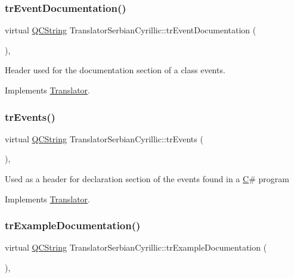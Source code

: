 \subsubsection{\texorpdfstring{trEventDocumentation()}{trEventDocumentation()}}
{\footnotesize\ttfamily virtual \mbox{\hyperlink{class_q_c_string}{Q\+C\+String}} Translator\+Serbian\+Cyrillic\+::tr\+Event\+Documentation (\begin{DoxyParamCaption}{ }\end{DoxyParamCaption})\hspace{0.3cm}{\ttfamily [inline]}, {\ttfamily [virtual]}}

Header used for the documentation section of a class\textquotesingle{} events. 

Implements \mbox{\hyperlink{class_translator}{Translator}}.

\mbox{\label{class_translator_serbian_cyrillic_a44fe734c8aebeab6c68c5bdd36e379c0}} 
\subsubsection{\texorpdfstring{trEvents()}{trEvents()}}
{\footnotesize\ttfamily virtual \mbox{\hyperlink{class_q_c_string}{Q\+C\+String}} Translator\+Serbian\+Cyrillic\+::tr\+Events (\begin{DoxyParamCaption}{ }\end{DoxyParamCaption})\hspace{0.3cm}{\ttfamily [inline]}, {\ttfamily [virtual]}}

Used as a header for declaration section of the events found in a \mbox{\hyperlink{class_c}{C}}\# program 

Implements \mbox{\hyperlink{class_translator}{Translator}}.

\mbox{\label{class_translator_serbian_cyrillic_a15f1c1e7cb0e576db381c487618e3eb2}} 
\subsubsection{\texorpdfstring{trExampleDocumentation()}{trExampleDocumentation()}}
{\footnotesize\ttfamily virtual \mbox{\hyperlink{class_q_c_string}{Q\+C\+String}} Translator\+Serbian\+Cyrillic\+::tr\+Example\+Documentation (\begin{DoxyParamCaption}{ }\end{DoxyParamCaption})\hspace{0.3cm}{\ttfamily [inline]}, {\ttfamily [virtual]}}

